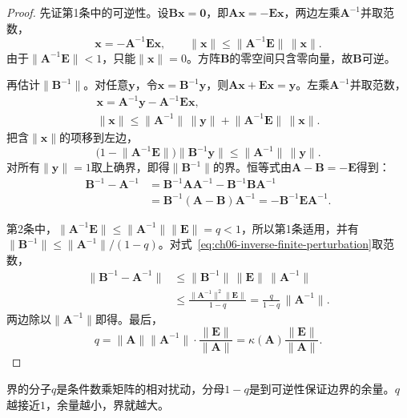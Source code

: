 \begin{proof}
先证第1条中的可逆性。设$\bm B\bm x=\bm0$，即$\bm A\bm x=-\bm E\bm x$，两边左乘$\bm A^{-1}$并取范数，
\[
 \bm x=-\bm A^{-1}\bm E\bm x,\qquad \lVert\bm x\rVert\leq\lVert\bm A^{-1}\bm E\rVert\,\lVert\bm x\rVert .
\]
由于$\lVert\bm A^{-1}\bm E\rVert<1$，只能$\lVert\bm x\rVert=0$。方阵$\bm B$的零空间只含零向量，故$\bm B$可逆。

再估计$\lVert\bm B^{-1}\rVert$。对任意$\bm y$，令$\bm x=\bm B^{-1}\bm y$，则$\bm A\bm x+\bm E\bm x=\bm y$。左乘$\bm A^{-1}$并取范数，
\[
 \begin{gathered}
 \bm x=\bm A^{-1}\bm y-\bm A^{-1}\bm E\bm x,\\
 \lVert\bm x\rVert\leq\lVert\bm A^{-1}\rVert\,\lVert\bm y\rVert+\lVert\bm A^{-1}\bm E\rVert\,\lVert\bm x\rVert .
 \end{gathered}
\]
把含$\lVert\bm x\rVert$的项移到左边，
\[
 \bigl(1-\lVert\bm A^{-1}\bm E\rVert\bigr)\lVert\bm B^{-1}\bm y\rVert\leq\lVert\bm A^{-1}\rVert\,\lVert\bm y\rVert .
\]
对所有$\lVert\bm y\rVert=1$取上确界，即得$\lVert\bm B^{-1}\rVert$的界。恒等式由$\bm A-\bm B=-\bm E$得到：
\[
 \begin{aligned}
 \bm B^{-1}-\bm A^{-1}&=\bm B^{-1}\bm A\bm A^{-1}-\bm B^{-1}\bm B\bm A^{-1}\\
 &=\bm B^{-1}(\bm A-\bm B)\bm A^{-1}=-\bm B^{-1}\bm E\bm A^{-1}.
 \end{aligned}
\]

第2条中，$\lVert\bm A^{-1}\bm E\rVert\leq\lVert\bm A^{-1}\rVert\lVert\bm E\rVert=q<1$，所以第1条适用，并有$\lVert\bm B^{-1}\rVert\leq\lVert\bm A^{-1}\rVert/(1-q)$。对式~\eqref{eq:ch06-inverse-finite-perturbation}取范数，
\[
 \begin{aligned}
 \lVert\bm B^{-1}-\bm A^{-1}\rVert&\leq\lVert\bm B^{-1}\rVert\,\lVert\bm E\rVert\,\lVert\bm A^{-1}\rVert\\
 &\leq\frac{\lVert\bm A^{-1}\rVert^2\lVert\bm E\rVert}{1-q}=\frac{q}{1-q}\,\lVert\bm A^{-1}\rVert .
 \end{aligned}
\]
两边除以$\lVert\bm A^{-1}\rVert$即得。最后，
\[
 q=\lVert\bm A\rVert\lVert\bm A^{-1}\rVert\cdot\frac{\lVert\bm E\rVert}{\lVert\bm A\rVert}=\kappa(\bm A)\frac{\lVert\bm E\rVert}{\lVert\bm A\rVert}.
\]
\end{proof}

界的分子$q$是条件数乘矩阵的相对扰动，分母$1-q$是到可逆性保证边界的余量。$q$越接近$1$，余量越小，界就越大。

